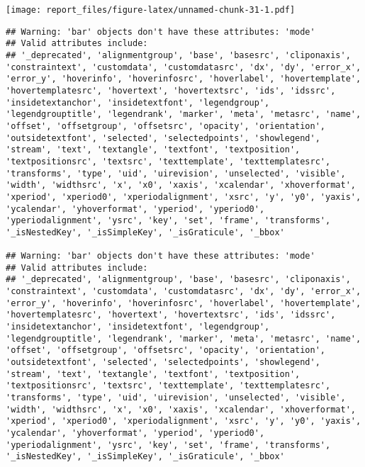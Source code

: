 \documentclass[
]{article}
\begin{document}
\texttt{[image: report\_files/figure-latex/unnamed-chunk-31-1.pdf]}

\begin{verbatim}
## Warning: 'bar' objects don't have these attributes: 'mode'
## Valid attributes include:
## '_deprecated', 'alignmentgroup', 'base', 'basesrc', 'cliponaxis', 'constraintext', 'customdata', 'customdatasrc', 'dx', 'dy', 'error_x', 'error_y', 'hoverinfo', 'hoverinfosrc', 'hoverlabel', 'hovertemplate', 'hovertemplatesrc', 'hovertext', 'hovertextsrc', 'ids', 'idssrc', 'insidetextanchor', 'insidetextfont', 'legendgroup', 'legendgrouptitle', 'legendrank', 'marker', 'meta', 'metasrc', 'name', 'offset', 'offsetgroup', 'offsetsrc', 'opacity', 'orientation', 'outsidetextfont', 'selected', 'selectedpoints', 'showlegend', 'stream', 'text', 'textangle', 'textfont', 'textposition', 'textpositionsrc', 'textsrc', 'texttemplate', 'texttemplatesrc', 'transforms', 'type', 'uid', 'uirevision', 'unselected', 'visible', 'width', 'widthsrc', 'x', 'x0', 'xaxis', 'xcalendar', 'xhoverformat', 'xperiod', 'xperiod0', 'xperiodalignment', 'xsrc', 'y', 'y0', 'yaxis', 'ycalendar', 'yhoverformat', 'yperiod', 'yperiod0', 'yperiodalignment', 'ysrc', 'key', 'set', 'frame', 'transforms', '_isNestedKey', '_isSimpleKey', '_isGraticule', '_bbox'

## Warning: 'bar' objects don't have these attributes: 'mode'
## Valid attributes include:
## '_deprecated', 'alignmentgroup', 'base', 'basesrc', 'cliponaxis', 'constraintext', 'customdata', 'customdatasrc', 'dx', 'dy', 'error_x', 'error_y', 'hoverinfo', 'hoverinfosrc', 'hoverlabel', 'hovertemplate', 'hovertemplatesrc', 'hovertext', 'hovertextsrc', 'ids', 'idssrc', 'insidetextanchor', 'insidetextfont', 'legendgroup', 'legendgrouptitle', 'legendrank', 'marker', 'meta', 'metasrc', 'name', 'offset', 'offsetgroup', 'offsetsrc', 'opacity', 'orientation', 'outsidetextfont', 'selected', 'selectedpoints', 'showlegend', 'stream', 'text', 'textangle', 'textfont', 'textposition', 'textpositionsrc', 'textsrc', 'texttemplate', 'texttemplatesrc', 'transforms', 'type', 'uid', 'uirevision', 'unselected', 'visible', 'width', 'widthsrc', 'x', 'x0', 'xaxis', 'xcalendar', 'xhoverformat', 'xperiod', 'xperiod0', 'xperiodalignment', 'xsrc', 'y', 'y0', 'yaxis', 'ycalendar', 'yhoverformat', 'yperiod', 'yperiod0', 'yperiodalignment', 'ysrc', 'key', 'set', 'frame', 'transforms', '_isNestedKey', '_isSimpleKey', '_isGraticule', '_bbox'


\end{verbatim}
\end{document}
